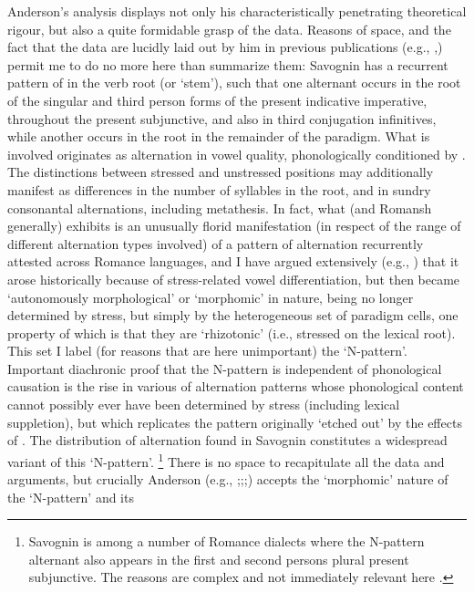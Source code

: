 \documentclass[output=paper,
modfonts
]{LSP/langsci}
\begin{document}
Anderson's analysis displays not only his characteristically penetrating
theoretical rigour, but also a quite formidable grasp of the data.
Reasons of space, and the fact that the data are lucidly laid out by him
in previous publications (e.g., \citealt{anderson2008a},\citeyear{anderson2011a}) permit me to do no
more here than summarize them: Savognin has a recurrent pattern of
 in the verb root (or `stem'), such that one
alternant occurs in the root of the singular and third person forms of
the present indicative imperative, throughout the present subjunctive,
and also in third conjugation infinitives, while another occurs in the
root in the remainder of the paradigm. What is involved originates as
alternation in vowel quality, phonologically conditioned by . The
distinctions between stressed and unstressed positions may additionally
manifest as differences in the number of syllables in the root, and in
sundry consonantal alternations, including metathesis. In fact, what
 (and Romansh generally) exhibits is an unusually florid
manifestation (in respect of the range of different alternation types
involved) of a pattern of alternation recurrently attested across
Romance languages, and I have argued extensively (e.g., \citealt{maiden2005a,maiden2011c}) that it arose historically because of stress-related vowel
differentiation, but then became `autonomously morphological' or
`morphomic' in nature, being no longer determined by stress, but simply
by the heterogeneous set of paradigm cells, one property of which is
that they are `rhizotonic' (i.e., stressed on the lexical root). This
set I label (for reasons that are here unimportant) the `N-pattern'.
Important diachronic proof that the N-pattern is independent of
phonological causation is the rise in various  of
alternation patterns whose phonological content cannot possibly ever
have been determined by stress (including lexical suppletion), but which
replicates the pattern originally `etched out' by the effects of .
The distribution of alternation found in Savognin constitutes a
widespread variant of this `N-pattern'. \footnote{Savognin is among a
  number of Romance dialects where the N-pattern alternant also appears
  in the first and second persons plural present subjunctive. The
  reasons are complex and not immediately relevant here \citep[cf.][]{maiden2012}.} There is no space to recapitulate all the data and arguments,
but crucially Anderson (e.g., \citeyear[25]{anderson2010a};\citeyear[34f]{anderson2011a};\citeyear[10,16,23]{anderson2013stem};\citeyear[173]{anderson2016r}) accepts the `morphomic' nature of the `N-pattern' and its
\end{document}
